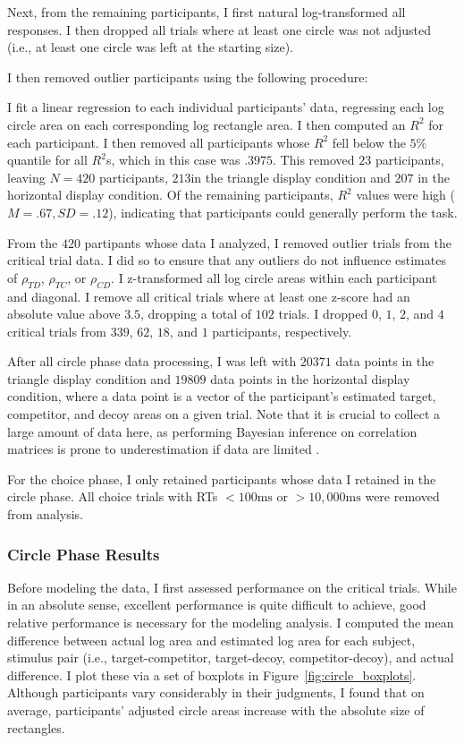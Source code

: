 Next, from the remaining participants, I first natural log-transformed all responses. I then dropped all trials where at least one circle was not adjusted (i.e., at least one circle was left at the starting size).

I then removed outlier participants using the following procedure:

I fit a linear regression to each individual participants' data, regressing each log circle area on each corresponding log rectangle area. I then computed an $R^2$ for each participant. I then removed all participants whose $R^2$ fell below the $5\%$ quantile for all $R^2$s, which in this case was $.3975$. This removed $23$ participants, leaving $N=420$ participants, $213 $in the triangle display condition and $207$ in the horizontal display condition. Of the remaining participants, $R^2$ values were high ($M=.67,SD=.12$), indicating that participants could generally perform the task.

From the $420$ partipants whose data I analyzed, I removed outlier trials from the critical trial data. I did so to ensure that any outliers do not influence estimates of $\rho_{TD}$, $\rho_{TC}$, or $\rho_{CD}$. I z-transformed all log circle areas within each participant and diagonal. I remove all critical trials where at least one z-score had an absolute value above $3.5$, dropping a total of $102$ trials. I dropped $0$, $1$, $2$, and $4$ critical trials from $339$, $62$, $18$, and $1$ participants, respectively. 

After all circle phase data processing, I was left with $20371$ data points in the triangle display condition and $19809$ data points in the horizontal display condition, where a data point is a vector of the participant's estimated target, competitor, and decoy areas on a given trial. Note that it is crucial to collect a large amount of data here, as performing Bayesian inference on correlation matrices is prone to underestimation if data are limited \parencite{martin2021,merkle2023opaque}. 

For the choice phase, I only retained participants whose data I retained in the circle phase. All choice trials with RTs $<100\text{ms}$ or $>10,000\text{ms}$ were removed from analysis.

\subsubsection{Circle Phase Results}
Before modeling the data, I first assessed performance on the critical trials. While in an absolute sense, excellent performance is quite difficult to achieve, good relative performance is necessary for the modeling analysis. I computed the mean difference between actual log area and estimated log area for each subject, stimulus pair (i.e., target-competitor, target-decoy, competitor-decoy), and actual difference. I plot these via a set of boxplots in Figure~\ref{fig:circle_boxplots}. Although participants vary considerably in their judgments, I found that on average, participants' adjusted circle areas increase with the absolute size of rectangles. 

